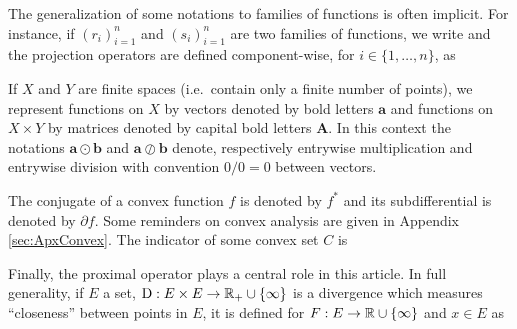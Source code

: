 The generalization of some notations to families of functions is often implicit. For instance, if $(r_i)_{i=1}^n$ and $(s_i)_{i=1}^n$ are two families of functions,  we write
and the projection operators are defined component-wise, for $i\in \{1,\dots,n\}$, as

If $X$ and $Y$ are finite spaces (i.e.\ contain only a finite number of points), we represent functions on $X$ by vectors denoted by bold letters $\mathbf{a}$ and functions on $X\times Y$ by matrices denoted by capital bold letters $\mathbf{A}$. In this context the notations $\mathbf{a}\odot\mathbf{b}$ and $\mathbf{a}\oslash\mathbf{b}$ denote, respectively entrywise multiplication and entrywise division with convention $0/0=0$ between vectors.

The conjugate of a convex function $f$ is denoted by $f^*$ and its subdifferential is denoted by $\partial f$. Some reminders on convex analysis are given in Appendix \ref{sec:ApxConvex}. The indicator of some convex set $C$ is 

Finally, the proximal operator plays a central role in this article. In full generality, if $E$ a set, $\operatorname{D}: E\times E\to \mathbb{R}_+\cup \{\infty\}$ is a divergence which measures ``closeness'' between points in $E$, it is defined for $F:E\to \mathbb{R}\cup \{\infty\}$ and $x\in E$ as


